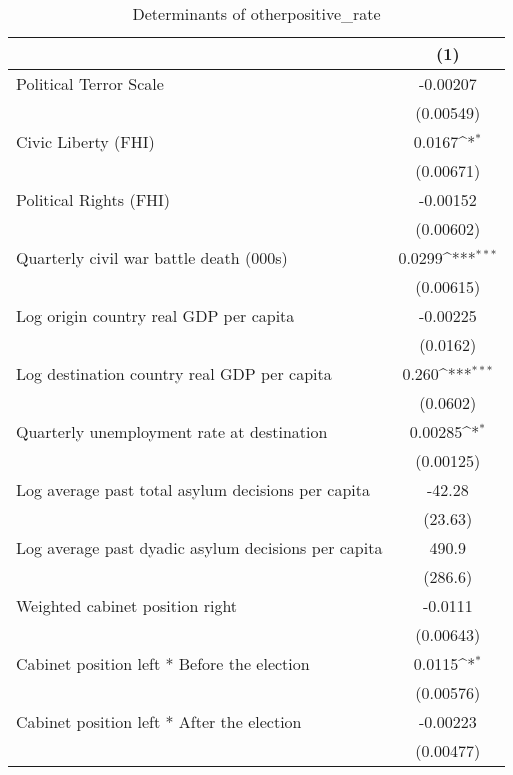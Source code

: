 \begin{table}[htbp]\centering
\def\sym#1{\ifmmode^{#1}\else\(^{#1}\)\fi}
\caption{Determinants of otherpositive\_rate}
\begin{tabular}{l*{1}{c}}
\hline\hline
                    &\multicolumn{1}{c}{(1)}         \\
\hline
Political Terror Scale&    -0.00207         \\
                    &   (0.00549)         \\
[1em]
Civic Liberty (FHI) &      0.0167\sym{*}  \\
                    &   (0.00671)         \\
[1em]
Political Rights (FHI)&    -0.00152         \\
                    &   (0.00602)         \\
[1em]
Quarterly civil war battle death (000s)&      0.0299\sym{***}\\
                    &   (0.00615)         \\
[1em]
Log origin country real GDP per capita&    -0.00225         \\
                    &    (0.0162)         \\
[1em]
Log destination country real GDP per capita&       0.260\sym{***}\\
                    &    (0.0602)         \\
[1em]
Quarterly unemployment rate at destination&     0.00285\sym{*}  \\
                    &   (0.00125)         \\
[1em]
Log average past total asylum decisions per capita&      -42.28         \\
                    &     (23.63)         \\
[1em]
Log average past dyadic asylum decisions per capita&       490.9         \\
                    &     (286.6)         \\
[1em]
Weighted cabinet position right&     -0.0111         \\
                    &   (0.00643)         \\
[1em]
Cabinet position left * Before the election&      0.0115\sym{*}  \\
                    &   (0.00576)         \\
[1em]
Cabinet position left * After the election&    -0.00223         \\
                    &   (0.00477)         \\

\end{tabular}
\end{table}
